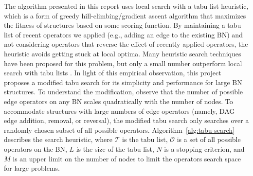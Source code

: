 \documentclass[11pt]{article}
\begin{document}
The algorithm presented in this report uses local search with a tabu list heuristic, which is a form of greedy hill-climbing/gradient ascent algorithm that maximizes the fitness of structures based on some scoring function. By maintaining a tabu list of recent operators we applied (e.g., adding an edge to the existing BN) and not considering operators that reverse the effect of recently applied operators, the heuristic avoids getting stuck at local optima. Many heuristic search techniques have been proposed for this problem, but only a small number outperform local search with tabu lists \cite{KF:09}. In light of this empirical observation, this project proposes a modified tabu search for its simplicity and performance for large BN structures. To understand the modification, observe that the number of possible edge operators on any BN scales quadratically with the number of nodes. To accommodate structures with large numbers of edge operators (namely, DAG edge addition, removal, or reversal), the modified tabu search only searches over a randomly chosen subset of all possible operators. Algorithm~\ref{alg:tabu-search} describes the search heuristic, where $\mathcal{T}$ is the tabu list, $\mathcal{O}$ is a set of all possible operators on the BN, $L$ is the size of the tabu list, $N$ is a stopping criterion, and $M$ is an upper limit on the number of nodes to limit the operators search space for large problems.
\end{document}
